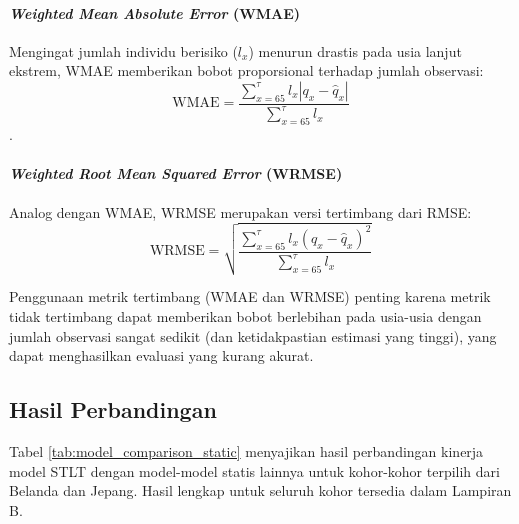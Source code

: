 \paragraph{\textit{Weighted Mean Absolute Error} (WMAE)}
Mengingat jumlah individu berisiko ($l_x$) menurun drastis pada usia lanjut ekstrem, WMAE memberikan bobot proporsional terhadap jumlah observasi:
\begin{equation}
\text{WMAE} = \frac{\sum_{x=65}^{\tau} l_x |q_x - \hat{q}_x|}{\sum_{x=65}^{\tau} l_x}
\end{equation}.

\paragraph{\textit{Weighted Root Mean Squared Error} (WRMSE)}
Analog dengan WMAE, WRMSE merupakan versi tertimbang dari RMSE:
\begin{equation}
\text{WRMSE} = \sqrt{\frac{\sum_{x=65}^{\tau} l_x (q_x - \hat{q}_x)^2}{\sum_{x=65}^{\tau} l_x}}
\end{equation}

Penggunaan metrik tertimbang (WMAE dan WRMSE) penting karena metrik tidak tertimbang dapat memberikan bobot berlebihan pada usia-usia dengan jumlah observasi sangat sedikit (dan ketidakpastian estimasi yang tinggi), yang dapat menghasilkan evaluasi yang kurang akurat.

\subsection{Hasil Perbandingan}

Tabel \ref{tab:model_comparison_static} menyajikan hasil perbandingan kinerja model STLT dengan model-model statis lainnya untuk kohor-kohor terpilih dari Belanda dan Jepang. Hasil lengkap untuk seluruh kohor tersedia dalam Lampiran B.

